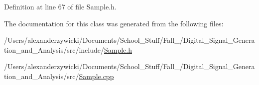 Definition at line 67 of file Sample.\+h.



The documentation for this class was generated from the following files\+:\begin{DoxyCompactItemize}
\item 
/\+Users/alexanderzywicki/\+Documents/\+School\+\_\+\+Stuff/\+Fall\+\_/\+Digital\+\_\+\+Signal\+\_\+\+Generation\+\_\+and\+\_\+\+Analysis/src/include/\hyperlink{Sample_8h}{Sample.\+h}\item 
/\+Users/alexanderzywicki/\+Documents/\+School\+\_\+\+Stuff/\+Fall\+\_/\+Digital\+\_\+\+Signal\+\_\+\+Generation\+\_\+and\+\_\+\+Analysis/src/\hyperlink{Sample_8cpp}{Sample.\+cpp}\end{DoxyCompactItemize}
